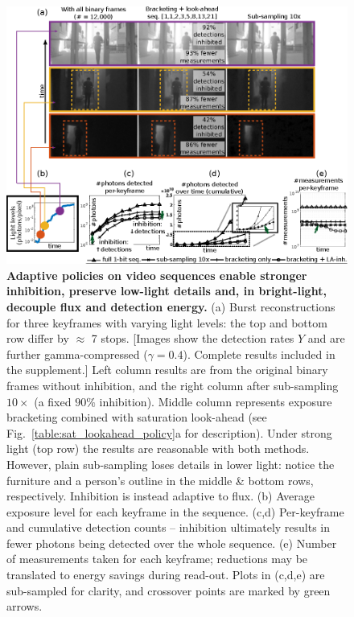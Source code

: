 \begin{figure}[t!]
    \centering
    \includegraphics[width=\textwidth]{figures/qbp_swissSPAD2/qbp_long_hdr_seq}
    \caption{\textbf{Adaptive policies on video sequences enable stronger inhibition, preserve low-light details and, in bright-light, decouple flux and detection energy.}
    (a) Burst reconstructions \cite{maQuantaBurstPhotography2020a} for three keyframes with varying light levels: the top and bottom row differ by $\approx$ 7 stops.
    [Images show the detection rates $Y$ and are further gamma-compressed ($\gamma = 0.4$).
    Complete results included in the supplement.]
    Left column results are from the original binary frames without inhibition, and the right column after sub-sampling $10\times$ (a fixed $90\%$ inhibition). Middle column represents exposure bracketing combined with saturation look-ahead (see Fig.~\ref{table:sat_lookahead_policy}a for description).
    Under strong light (top row) the results are reasonable with both methods.
    However, plain sub-sampling loses details in lower light: notice the furniture and a person's outline in the middle \& bottom rows, respectively.
    Inhibition is instead adaptive to flux.  
    (b) Average exposure level for each keyframe in the sequence.
    (c,d) Per-keyframe and cumulative detection counts -- inhibition ultimately results in fewer photons being detected over the whole sequence. (e) Number of measurements taken for each keyframe; reductions may be translated to energy savings during read-out. Plots in (c,d,e) are sub-sampled for clarity, and crossover points are marked by green arrows.
    }
    \label{fig:qbp_long_hdr_seq}
\end{figure}
